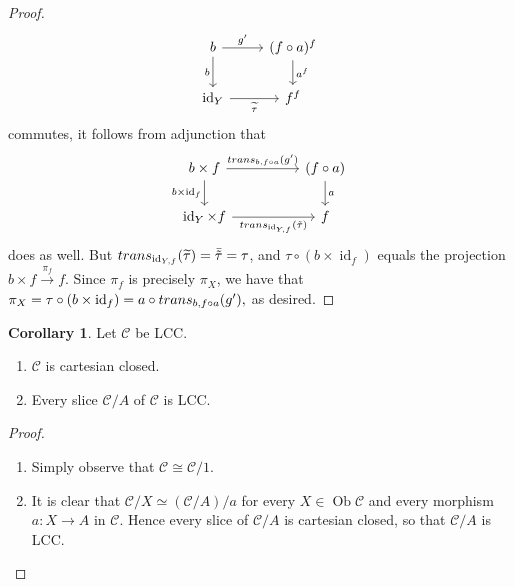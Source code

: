 \documentclass[10pt,letterpaper,cm]{nupset}
\theoremstyle{definition}
\theoremstyle{theorem}
\newtheorem{corollary}[definition]{Corollary}
\theoremstyle{remark}
\DeclareMathOperator{\ob}{Ob}
\newcommand{\0}{\mathbf{0}}
\newcommand{\1}{\mathbf{1}}
\newcommand{\2}{\mathbf{2}}
\renewcommand{\c}{\mathscr{C}}
\DeclareMathOperator{\idd}{id}
\DeclareMathOperator{\trans}{\mathnormal{trans}}
\newcommand{\be}{\begin{enumerate}}
\newcommand{\ee}{\end{enumerate}}
\begin{document}
\begin{proof}
\[\begin{tikzcd}
b \arrow[d, "b"'] \arrow[r, "g'"]      & (f\circ a)^f \arrow[d, "a^f"] \\
\idd_Y \arrow[r, "\widetilde{\tau}"'] & f^f                          
\end{tikzcd}
\] 
commutes, it follows from adjunction that
\[
\begin{tikzcd}[column sep =huge]
b \times f \arrow[d, "b \times \idd_f"'] \arrow[r, "{\trans_{b, f\circ a}(g')}"] & (f\circ a) \arrow[d, "a"] \\
\idd_Y \times f \arrow[r, "{\trans_{\idd_{Y, f}}(\tilde{\tau})}"']            & f                        
\end{tikzcd}
\] 
does as well. But $\trans_{\idd_{Y, f}}(\widetilde{\tau}) = \bar{\tilde{\tau}} = \tau$, and $\tau \circ \left(b \times \idd_f\right)$ equals the projection $b \times f \overset{\pi_f}{\longrightarrow} f$. Since $\pi_f$ is precisely $\pi_X$, we have that  $\pi_X = \tau \circ \left(b \times \idd_f\right) = a \circ \trans_{b, f\circ a}(g'), $ as desired. 
\end{proof}

\begin{corollary} Let $\c$ be LCC.
\be
\item $\c$ is cartesian closed.
\item Every slice $\c/A$ of $\c$ is LCC.
\ee
\end{corollary}
\begin{proof} $ $
\be
\item  Simply observe that $\c \cong \c/1$.
\item It is clear that $\c/X \simeq \left(\c/A\right)/a$ for every $X\in \ob{\c}$ and every morphism $a: X\to A$ in $\c$. Hence every slice of $\c/A$ is cartesian closed, so that $\c/A$ is LCC.
\ee
\end{proof}

\pagebreak
\end{document}
